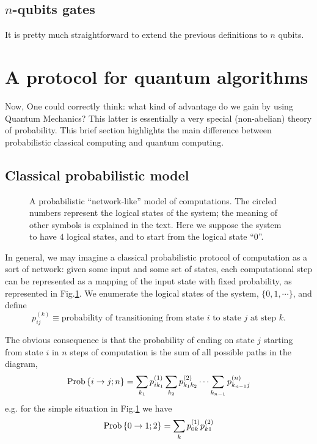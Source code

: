\subsection{$n$-qubits gates}

It is pretty much straightforward to extend the previous definitions to $n$ qubits. 

\section{A protocol for quantum algorithms}

Now, One could correctly think: what kind of advantage do we gain by using Quantum Mechanics? This latter is essentially a very special (non-abelian) theory of probability. This brief section highlights the main difference between probabilistic classical computing and quantum computing.

\subsection{Classical probabilistic model}

\begin{figure}
    \centering
    
    \caption{A probabilistic ``network-like'' model of computations. The circled numbers represent the logical states of the system; the meaning of other symbols is explained in the text. Here we suppose the system to have $4$ logical states, and to start from the logical state ``$0$''.}
    \label{fig:probabilistic model}
\end{figure}

In general, we may imagine a classical probabilistic protocol of computation as a sort of network: given some input and some set of states, each computational step can be represented as a mapping of the input state with fixed probability, as represented in Fig.\ref{fig:probabilistic model}. We enumerate the logical states of the system, $\lbrace 0,1,\cdots \rbrace$, and define
\[
    p_{ij}^{(k)} \equiv \text{probability of transitioning from state $i$ to state $j$ at step $k$.}
\]

The obvious consequence is that the probability of ending on state $j$ starting from state $i$ in $n$ steps of computation is the sum of all possible paths in the diagram,
\[
    \mathrm{Prob}\left\lbrace i \to j; n \right\rbrace = \sum_{k_1} p_{ik_1}^{(1)} \sum_{k_2} p_{k_1 k_2}^{(2)} \cdots \sum_{k_{n-1}} p_{k_{n-1} j}^{(n)}
\]
e.g. for the simple situation in Fig.\ref{fig:probabilistic model} we have
\[
    \mathrm{Prob}\left\lbrace 0 \to 1;2 \right\rbrace = \sum_k p_{0k}^{(1)} p_{k1}^{(2)}
\]

